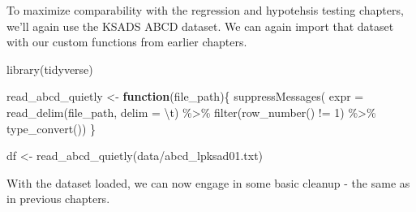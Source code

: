 \documentclass[
]{book}
\newenvironment{Shaded}{\begin{snugshade}}{\end{snugshade}}
\newcommand{\AttributeTok}[1]{\textcolor[rgb]{0.77,0.63,0.00}{#1}}
\newcommand{\ControlFlowTok}[1]{\textcolor[rgb]{0.13,0.29,0.53}{\textbf{#1}}}
\newcommand{\DecValTok}[1]{\textcolor[rgb]{0.00,0.00,0.81}{#1}}
\newcommand{\FunctionTok}[1]{\textcolor[rgb]{0.00,0.00,0.00}{#1}}
\newcommand{\NormalTok}[1]{#1}
\newcommand{\OtherTok}[1]{\textcolor[rgb]{0.56,0.35,0.01}{#1}}
\newcommand{\SpecialCharTok}[1]{\textcolor[rgb]{0.00,0.00,0.00}{#1}}
\newcommand{\StringTok}[1]{\textcolor[rgb]{0.31,0.60,0.02}{#1}}
\begin{document}
To maximize comparability with the regression and hypotehsis testing chapters, we'll again use the KSADS ABCD dataset. We can again import that dataset with our custom functions from earlier chapters.

\begin{Shaded}
\begin{Highlighting}[]
\FunctionTok{library}\NormalTok{(tidyverse)}

\NormalTok{read\_abcd\_quietly }\OtherTok{\textless{}{-}} \ControlFlowTok{function}\NormalTok{(file\_path)\{}
  \FunctionTok{suppressMessages}\NormalTok{(}
    \AttributeTok{expr =} \FunctionTok{read\_delim}\NormalTok{(file\_path, }\AttributeTok{delim =} \StringTok{\textquotesingle{}}\SpecialCharTok{\textbackslash{}t}\StringTok{\textquotesingle{}}\NormalTok{) }\SpecialCharTok{\%\textgreater{}\%} 
      \FunctionTok{filter}\NormalTok{(}\FunctionTok{row\_number}\NormalTok{() }\SpecialCharTok{!=} \DecValTok{1}\NormalTok{) }\SpecialCharTok{\%\textgreater{}\%} 
      \FunctionTok{type\_convert}\NormalTok{())}
\NormalTok{\}}

\NormalTok{df }\OtherTok{\textless{}{-}} \FunctionTok{read\_abcd\_quietly}\NormalTok{(}\StringTok{\textquotesingle{}data/abcd\_lpksad01.txt\textquotesingle{}}\NormalTok{)}
\end{Highlighting}
\end{Shaded}

With the dataset loaded, we can now engage in some basic cleanup - the same as in previous chapters.
\end{document}
